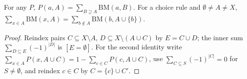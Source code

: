 \begin{lemma}
\label{lem:beh-bm-flow}
\leanok
{}
For any $P$, $P(a,A)=\sum_{B\supseteq A}\mathrm{BM}(a,B)$. For a choice rule and $\emptyset\ne A\ne X$,
$\sum_{x\in A}\mathrm{BM}(x,A)=\sum_{b\notin A}\mathrm{BM}(b,A\cup\{b\})$.
\end{lemma}
\begin{proof}
\leanok
Reindex pairs $C\subseteq X\setminus A$, $D\subseteq X\setminus(A\cup C)$ by $E=C\cup D$; the inner sum
$\sum_{D\subseteq E}(-1)^{|D|}$ is $[E=\emptyset]$. For the second identity write $\sum_{x\in A}P(x,A\cup C)=1-\sum_{c\in C}P(c,A\cup C)$,
use $\sum_{C\subseteq S}(-1)^{|C|}=0$ for $S\ne\emptyset$, and reindex $c\in C$ by $C=\{c\}\cup C'$.
\end{proof}

